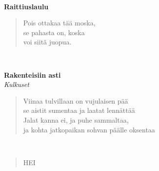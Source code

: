\noindent\begin{minipage}{\linewidth}
\begin{verse}
	
\end{verse}
\end{minipage}\\[10pt]
%
%
\noindent\begin{minipage}{\linewidth}
\vspace{5pt}
\parbox[t]{0.85\linewidth}{\raggedright {\large\bf Raittiuslaulu}\\[6pt]}
\begin{verse}
	Pois ottakaa tää moska,\\
	se pahasta on, koska\\
	voi siitä juopua.\\
	
\end{verse}
\end{minipage}\\[10pt]
%
%
\noindent\begin{minipage}{\linewidth}
\vspace{5pt}
\parbox[t]{0.85\linewidth}{\raggedright {\large\bf Rakenteisiin asti}\\[2pt]\small\emph{Kulkuset}\\[6pt]}
\begin{verse}
	
	Viinaa tulvillaan on vujulaisen pää\\
	se aistit sumentaa ja laatat lennättää\\
	Jalat kanna ei, ja puhe sammaltaa,\\
	ja kohta jatkopaikan sohvan päälle oksentaa\\
\end{verse}
\end{minipage}\\[10pt]
\noindent\begin{minipage}{\linewidth}
\begin{verse}
	HEI\\
\end{verse}
\end{minipage}\\[10pt]
